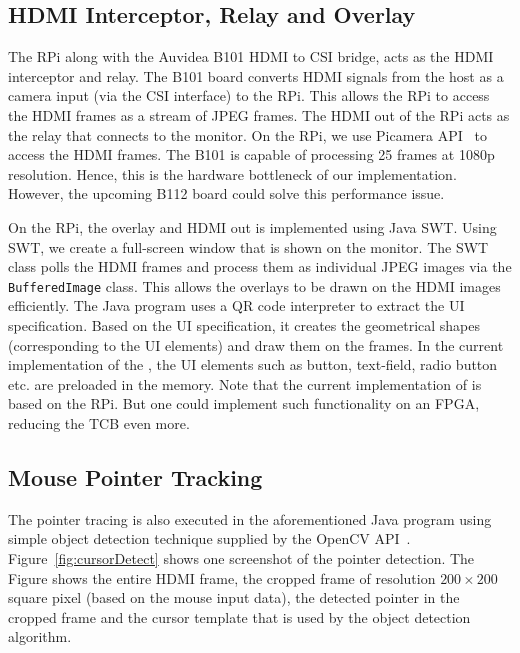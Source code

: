 \subsection{HDMI Interceptor, Relay and Overlay}
The RPi along with the Auvidea B101 HDMI to CSI bridge, acts as the HDMI interceptor and relay. The B101 board converts HDMI signals from the host as a camera input (via the CSI interface) to the RPi. This allows the RPi to access the HDMI frames as a stream of JPEG frames. The HDMI out of the RPi acts as the relay that connects to the monitor. On the RPi, we use Picamera API~\cite{picamera} to access the HDMI frames. The B101 is capable of processing 25 frames at 1080p resolution. Hence, this is the hardware bottleneck of our implementation. However, the upcoming B112 board
could solve this performance issue.

On the RPi, the overlay and HDMI out is implemented using Java SWT. Using SWT, we create a full-screen window that is shown on the monitor. The SWT class polls the HDMI frames and process them as individual JPEG images via the \texttt{BufferedImage} class. This allows the overlays to be drawn on the HDMI images efficiently. The Java program uses a QR code interpreter to extract the UI specification. Based on the UI specification, it creates the geometrical shapes (corresponding to the UI elements) and draw them on the frames. In the current implementation of the \name, the UI elements such as button, text-field, radio button etc. are preloaded in the \device memory. Note that the current implementation of \device is based on the RPi. But one could implement such functionality on an FPGA, reducing the TCB even more. 


\subsection{Mouse Pointer Tracking}
The pointer tracing is also executed in the aforementioned Java program using simple object detection technique supplied by the OpenCV API~\cite{opencv}. Figure~\ref{fig:cursorDetect} shows one screenshot of the pointer detection. The Figure shows the entire HDMI frame, the cropped frame of resolution $200 \times 200$ square pixel (based on the mouse input data), the detected pointer in the cropped frame and the cursor template that is used by the object detection algorithm.



